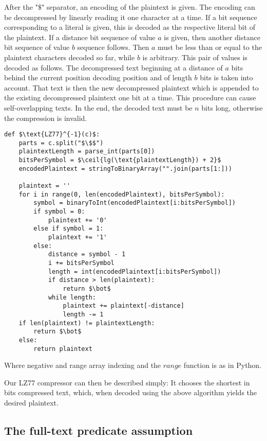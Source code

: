 \documentclass{article}
\DeclarePairedDelimiter{\ceil}{\lceil}{\rceil}
\begin{document}
After the "$\$$" separator, an encoding of the plaintext is given. The encoding
can be decompressed by linearly reading it one character at a time. If a bit sequence
corresponding to a literal
is given, this is decoded as the respective literal bit of the plaintext. If
a distance bit sequence of value $a$ is given, then another distance bit sequence of value $b$ sequence follows.
Then $a$ must be less than or equal to the plaintext characters decoded so far, while $b$
is arbitrary. This pair of values is decoded as follows. The decompressed text beginning at a distance of $a$ bits behind the current position decoding position and of length $b$ bits is taken into account. That text is then the new decompressed plaintext which is appended to the existing decompressed plaintext one bit at a time. This
procedure can cause self-overlapping texts. In the end, the decoded text must be $n$
bits long, otherwise the compression is invalid.

\begin{lstlisting}[texcl,mathescape]
def $\text{LZ77}^{-1}(c)$:
    parts = c.split("$\$$")
    plaintextLength = parse_int(parts[0])
    bitsPerSymbol = $\ceil{lg(\text{plaintextLength}) + 2}$
    encodedPlaintext = stringToBinaryArray("".join(parts[1:]))
    
    plaintext = ''
    for i in range(0, len(encodedPlaintext), bitsPerSymbol):
        symbol = binaryToInt(encodedPlaintext[i:bitsPerSymbol])
        if symbol = 0:
            plaintext += '0'
        else if symbol = 1:
            plaintext += '1'
        else:
            distance = symbol - 1
            i += bitsPerSymbol
            length = int(encodedPlaintext[i:bitsPerSymbol])
            if distance > len(plaintext):
                return $\bot$
            while length:
                plaintext += plaintext[-distance]
                length -= 1
    if len(plaintext) != plaintextLength:
        return $\bot$
    else:
        return plaintext
\end{lstlisting}

Where negative and range array indexing and the $range$ function is as in Python.

Our LZ77 compressor can then be described simply: It chooses the shortest
in bits compressed text, which, when decoded
using the above algorithm yields the desired plaintext.


\subsection{The full-text predicate assumption}
\end{document}
